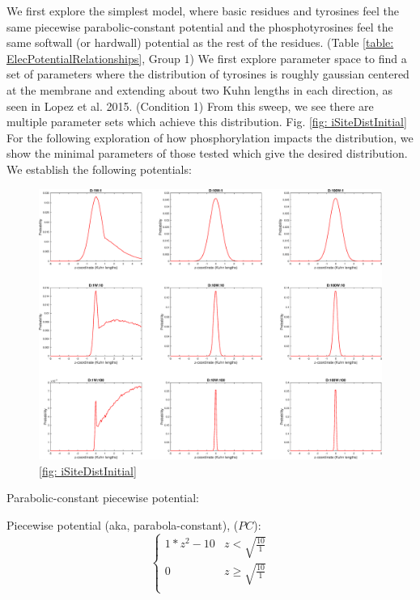 \documentclass[../../AdvancementSummary.tex]{subfiles}
\begin{document}
{We first explore the simplest model, where basic residues and tyrosines feel the same piecewise parabolic-constant potential and the phosphotyrosines feel the same softwall (or hardwall) potential as the rest of the residues. (Table \ref{table: ElecPotentialRelationships}, Group 1) We first explore parameter space to find a set of parameters where the distribution of tyrosines is roughly gaussian centered at the membrane and extending about two Kuhn lengths in each direction, as seen in Lopez et al. 2015. (Condition 1) From this sweep, we see there are multiple parameter sets which achieve this distribution.  Fig. \ref{fig: iSiteDistInitial} For the following exploration of how phosphorylation impacts the distribution, we show the minimal parameters of those tested which give the desired distribution. We establish the following potentials:


\begin{figure}[H]
\begin{center}
\includegraphics[width=0.8\linewidth]{ResultsFigures/CD3ZetaSoftwallPiecewiseBasicsY/DistributioniSite7.eps}
\end{center}
\caption{\ref{fig: iSiteDistInitial}}
\end{figure}

Parabolic-constant piecewise potential:

Piecewise potential (aka, parabola-constant), ($PC$):
\begin{equation}\label{eq: parabolaconstant}
\begin{cases}
1*z^2-10 	& z<\sqrt{\frac{10}{1}}\\
0 & z \geq \sqrt{\frac{10}{1}} \\
\end{cases}
\end{equation}


}
\end{document}
